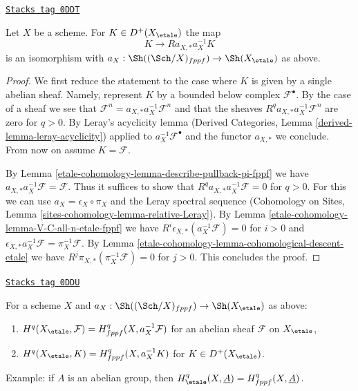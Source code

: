 \begin{lemma}
\label{etale-cohomology-lemma-cohomological-descent-etale-fppf}
\href{https://stacks.math.columbia.edu/tag/0DDT}{\texttt{Stacks tag 0DDT}}

Let $X$ be a scheme. For $K \in D^+(X_\etale)$ the map
$$
K \longrightarrow Ra_{X, *}a_X^{-1}K
$$
is an isomorphism with $a_X : \Sh((\Sch/X)_{fppf}) \to \Sh(X_\etale)$
as above.
\end{lemma}

\begin{proof}
We first reduce the statement to the case where
$K$ is given by a single abelian sheaf. Namely, represent $K$
by a bounded below complex $\mathcal{F}^\bullet$. By the case of a
sheaf we see that
$\mathcal{F}^n = a_{X, *} a_X^{-1} \mathcal{F}^n$
and that the sheaves $R^qa_{X, *}a_X^{-1}\mathcal{F}^n$
are zero for $q > 0$. By Leray's acyclicity lemma
(Derived Categories, Lemma \ref{derived-lemma-leray-acyclicity})
applied to $a_X^{-1}\mathcal{F}^\bullet$
and the functor $a_{X, *}$ we conclude. From now on assume $K = \mathcal{F}$.

\medskip\noindent
By Lemma \ref{etale-cohomology-lemma-describe-pullback-pi-fppf} we have
$a_{X, *}a_X^{-1}\mathcal{F} = \mathcal{F}$. Thus it suffices to show that
$R^qa_{X, *}a_X^{-1}\mathcal{F} = 0$ for $q > 0$.
For this we can use $a_X = \epsilon_X \circ \pi_X$ and
the Leray spectral sequence
(Cohomology on Sites, Lemma \ref{sites-cohomology-lemma-relative-Leray}).
By Lemma \ref{etale-cohomology-lemma-V-C-all-n-etale-fppf}
we have $R^i\epsilon_{X, *}(a_X^{-1}\mathcal{F}) = 0$ for $i > 0$
and
$\epsilon_{X, *}a_X^{-1}\mathcal{F} = \pi_X^{-1}\mathcal{F}$.
By Lemma \ref{etale-cohomology-lemma-cohomological-descent-etale} we have
$R^j\pi_{X, *}(\pi_X^{-1}\mathcal{F}) = 0$ for $j > 0$.
This concludes the proof.
\end{proof}

\begin{lemma}
\label{etale-cohomology-lemma-compare-cohomology-etale-fppf}
\href{https://stacks.math.columbia.edu/tag/0DDU}{\texttt{Stacks tag 0DDU}}

For a scheme $X$ and $a_X : \Sh((\Sch/X)_{fppf}) \to \Sh(X_\etale)$
as above:
\begin{enumerate}
\item $H^q(X_\etale, \mathcal{F}) = H^q_{fppf}(X, a_X^{-1}\mathcal{F})$
for an abelian sheaf $\mathcal{F}$ on $X_\etale$,
\item $H^q(X_\etale, K) = H^q_{fppf}(X, a_X^{-1}K)$ for $K \in D^+(X_\etale)$.
\end{enumerate}
Example: if $A$ is an abelian group, then
$H^q_\etale(X, \underline{A}) = H^q_{fppf}(X, \underline{A})$.
\end{lemma}

